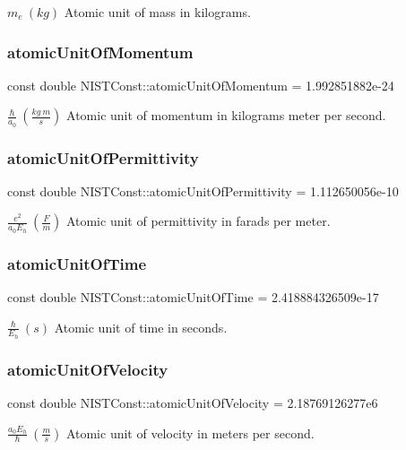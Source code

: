 $m_e \ (kg)$ Atomic unit of mass in kilograms. \mbox{\label{group___atomic_unit_gae70262618755d765a1de59f471b56040}} 
\subsubsection{\texorpdfstring{atomic\+Unit\+Of\+Momentum}{atomicUnitOfMomentum}}
{\footnotesize\ttfamily const double N\+I\+S\+T\+Const\+::atomic\+Unit\+Of\+Momentum = 1.\+992851882e-\/24}

$\frac{\hbar}{a_0} \ (\frac{kg\ m}{s})$ Atomic unit of momentum in kilograms meter per second. \mbox{\label{group___atomic_unit_ga0b7518cf6058bb899c64b32b43bda955}} 
\subsubsection{\texorpdfstring{atomic\+Unit\+Of\+Permittivity}{atomicUnitOfPermittivity}}
{\footnotesize\ttfamily const double N\+I\+S\+T\+Const\+::atomic\+Unit\+Of\+Permittivity = 1.\+112650056e-\/10}

$\frac{e^2}{a_0 E_h} \ (\frac{F}{m})$ Atomic unit of permittivity in farads per meter. \mbox{\label{group___atomic_unit_ga6181f64b8320afb6ecacc9c7f7e27afa}} 
\subsubsection{\texorpdfstring{atomic\+Unit\+Of\+Time}{atomicUnitOfTime}}
{\footnotesize\ttfamily const double N\+I\+S\+T\+Const\+::atomic\+Unit\+Of\+Time = 2.\+418884326509e-\/17}

$\frac{\hbar}{E_h} \ (s)$ Atomic unit of time in seconds. \mbox{\label{group___atomic_unit_gaf22e630a5412176c4d94dbc8b1e36f70}} 
\subsubsection{\texorpdfstring{atomic\+Unit\+Of\+Velocity}{atomicUnitOfVelocity}}
{\footnotesize\ttfamily const double N\+I\+S\+T\+Const\+::atomic\+Unit\+Of\+Velocity = 2.\+18769126277e6}

$\frac{a_0 E_h}{\hbar} \ (\frac{m}{s})$ Atomic unit of velocity in meters per second. 